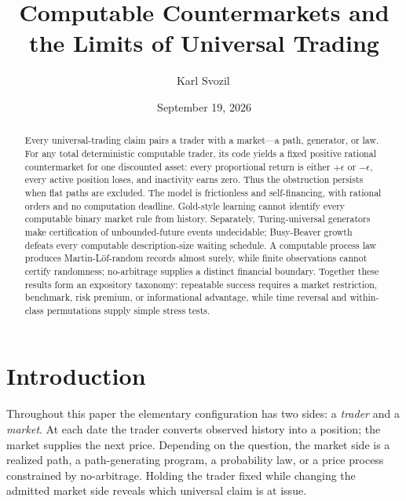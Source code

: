 \documentclass[aps,pra,reprint,superscriptaddress,amsmath,amssymb,floatfix]{revtex4-2}
\theoremstyle{plain}
\theoremstyle{definition}
\theoremstyle{remark}
\begin{document}
\title{Computable Countermarkets and the Limits of Universal Trading}

\author{Karl Svozil\,}

\date{September 19, 2026}

\begin{abstract}
Every universal-trading claim pairs a trader with a market---a path, generator,
or law. For any total deterministic computable trader, its code yields a fixed
positive rational countermarket for one discounted asset: every proportional
return is either \(+\epsilon\) or \(-\epsilon\), every active position loses,
and inactivity earns zero. Thus the obstruction persists when flat paths are
excluded. The model is frictionless and self-financing, with rational orders
and no computation deadline. Gold-style learning cannot
identify every computable binary market rule from history. Separately,
Turing-universal generators make certification of unbounded-future events
undecidable; Busy-Beaver growth defeats every computable description-size
waiting schedule. A computable process law produces Martin-L\"of-random
records almost surely, while finite observations cannot certify randomness;
no-arbitrage supplies a distinct financial boundary. Together these results
form an expository taxonomy: repeatable success requires a market restriction,
benchmark, risk premium, or informational advantage, while time reversal and
within-class permutations supply simple stress tests.
\end{abstract}

\maketitle

\section{Introduction}
\label{sec:intro}

Throughout this paper the elementary configuration has two sides: a
\emph{trader} and a \emph{market}. At each date the trader converts observed
history into a position; the market supplies the next price. Depending on the
question, the market side is a realized path, a path-generating program, a
probability law, or a price process constrained by no-arbitrage. Holding the
trader fixed while changing the admitted market side reveals which universal
claim is at issue.
\end{document}
